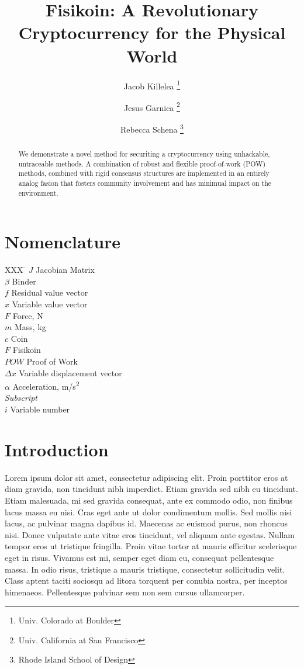 \documentclass[]{aiaa-tc}%
\title{Fisikoin: A Revolutionary Cryptocurrency for the Physical World}
\author{
  Jacob Killelea%
    \thanks{Univ. Colorado at Boulder}
  \and Jesus Garnica%
    \thanks{Univ. California at San Francisco}\\
  \and
  Rebecca Schena%
    \thanks{Rhode Island School of Design}\\
 }
\begin{document}
\maketitle

\begin{abstract}
We demonstrate a novel method for securiting a cryptocurrency using unhackable, 
untraceable methods. A combination of robust and flexible proof-of-work (POW) methods,
combined with rigid consensus structures are implemented in an entirely analog fasion 
that fosters community involvement and has minimual impact on the environment.
\end{abstract}

\section*{Nomenclature}

\begin{tabbing}
  XXX \= \kill%
  $J$ \> Jacobian Matrix \\
  $\beta$ \> Binder \\
  $f$ \> Residual value vector \\
  $x$ \> Variable value vector \\
  $F$ \> Force, N \\
  $m$ \> Mass, kg \\
  $c$ \> Coin \\
  $F$ \> Fisikoin \\
  $POW$ \> Proof of Work \\
  $\Delta x$ \> Variable displacement vector \\
  $\alpha$ \> Acceleration, m/s\textsuperscript{2} \\[5pt]
  \textit{Subscript}\\
  $i$ \> Variable number \\
 \end{tabbing}

\section{Introduction}


Lorem ipsum dolor sit amet, consectetur adipiscing elit. Proin porttitor eros at diam gravida, non tincidunt nibh imperdiet. Etiam gravida sed nibh eu tincidunt. Etiam malesuada, mi sed gravida consequat, ante ex commodo odio, non finibus lacus massa eu nisi. Cras eget ante ut dolor condimentum mollis. Sed mollis nisi lacus, ac pulvinar magna dapibus id. Maecenas ac euismod purus, non rhoncus nisi. Donec vulputate ante vitae eros tincidunt, vel aliquam ante egestas. Nullam tempor eros ut tristique fringilla. Proin vitae tortor at mauris efficitur scelerisque eget in risus. Vivamus est mi, semper eget diam eu, consequat pellentesque massa. In odio risus, tristique a mauris tristique, consectetur sollicitudin velit. Class aptent taciti sociosqu ad litora torquent per conubia nostra, per inceptos himenaeos. Pellentesque pulvinar sem non sem cursus ullamcorper.
\end{document}
